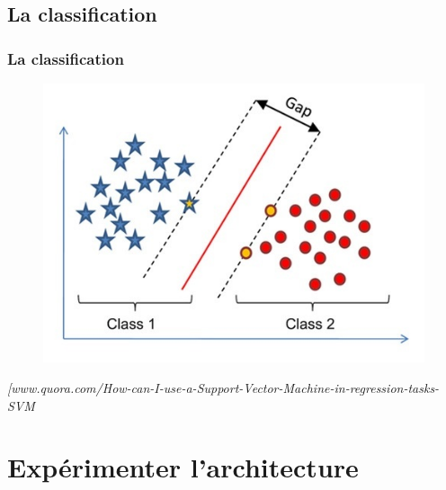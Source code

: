 \documentclass{beamer}
\newcommand{\refimg}[1]{\footnotesize\textit{#1}}
\begin{document}
\subsection{La classification}
\begin{frame}
	\frametitle{La classification}
	\begin{figure}
    	\centering
		\includegraphics[scale=0.5]{image/svm.jpg}
	\end{figure}
    \refimg{[www.quora.com/How-can-I-use-a-Support-Vector-Machine-in-regression-tasks-SVM}
\end{frame}

\section{Expérimenter l'architecture}
\end{document}

